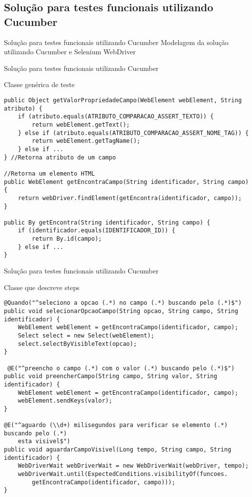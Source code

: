 \documentclass{beamer}
\begin{document}
\subsection{Solução para testes funcionais utilizando Cucumber}
\begin{frame}{Solução para testes funcionais utilizando Cucumber}
    Modelagem da solução utilizando Cucumber e Selenium WebDriver
	\begin{center}\end{center}
\end{frame}
\begin{frame}[fragile]{Solução para testes funcionais utilizando Cucumber}
    \item Classe genérica de teste
    \begin{lstlisting}
public Object getValorPropriedadeCampo(WebElement webElement, String atributo) {
    if (atributo.equals(ATRIBUTO_COMPARACAO_ASSERT_TEXTO)) {
        return webElement.getText();
    } else if (atributo.equals(ATRIBUTO_COMPARACAO_ASSERT_NOME_TAG)) {
        return webElement.getTagName();
    } else if ...
} //Retorna atributo de um campo

//Retorna um elemento HTML
public WebElement getEncontraCampo(String identificador, String campo) {
    return webDriver.findElement(getEncontra(identificador, campo));
}

public By getEncontra(String identificador, String campo) {
    if (identificador.equals(IDENTIFICADOR_ID)) {
        return By.id(campo);
    } else if ...
}
	\end{lstlisting}
\end{frame}
\begin{frame}[fragile]{Solução para testes funcionais utilizando Cucumber}
    \item Classe que descreve steps
    \begin{lstlisting}
@Quando("^seleciono a opcao (.*) no campo (.*) buscando pelo (.*)$")
public void selecionarOpcaoCampo(String opcao, String campo, String identificador) {
    WebElement webElement = getEncontraCampo(identificador, campo);
    Select select = new Select(webElement);
    select.selectByVisibleText(opcao);
}

 @E("^preencho o campo (.*) com o valor (.*) buscando pelo (.*)$")
public void preencherCampo(String campo, String valor, String identificador) {
    WebElement webElement = getEncontraCampo(identificador, campo);
    webElement.sendKeys(valor);
}

@E("^aguardo (\\d+) milisegundos para verificar se elemento (.*) buscando pelo (.*)
    esta visivel$")
public void aguardarCampoVisivel(Long tempo, String campo, String identificador) {
    WebDriverWait webDriverWait = new WebDriverWait(webDriver, tempo);
    webDriverWait.until(ExpectedConditions.visibilityOf(funcoes.
        getEncontraCampo(identificador, campo)));
}
    \end{lstlisting}
\end{frame}
\end{document}
